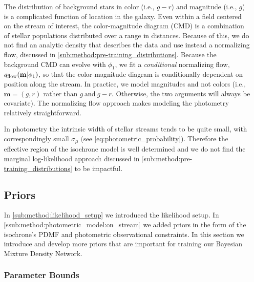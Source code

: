 \documentclass[twocolumn]{aastex631}
\begin{document}
            The distribution of background stars in color (i.e., $g-r$) and
            magnitude (i.e., $g$) is a complicated function of location in the
            galaxy. Even within a field centered on the stream of interest, the
            color-magnitude diagram (CMD) is a combination of stellar
            populations distributed over a range in distances. Because of this,
            we do not find an analytic density that describes the data and use
            instead a normalizing flow, discussed in
            \autoref{sub:method:pre-training_distributions}.  Because the
            background CMD can evolve with $\phi_1$, we fit a \emph{conditional}
            normalizing flow, $q_{\rm flow}(\mathbf{m}|\phi_1)$, so that the
            color-magnitude diagram is conditionally dependent on position along
            the stream. In practice, we model magnitudes and not colors (i.e.,
            $\mathbf{m} = (g,r)$ rather than $g \ \mathrm{and} \ g-r$.
            Otherwise, the two arguments will always be covariate). The
            normalizing flow approach makes modeling the photometry relatively
            straightforward.

            In photometry the intrinsic width of stellar streams tends to be
            quite small, with correspondingly small $\sigma_\mu$ (see
            \autoref{eq:photometric_probability}). Therefore the effective
            region of the isochrone model is well determined and we do not find
            the marginal log-likelihood approach discussed in
            \autoref{sub:method:pre-training_distributions} to be impactful.



    \subsection{Priors} \label{sub:methods:priors}

        In \autoref{sub:method:likelihood_setup} we introduced the likelihood
        setup. In \autoref{ssub:method:photometric_model:on_stream} we added
        priors in the form of the isochrone's PDMF and photometric observational
        constraints. In this section we introduce and develop more priors that
        are important for training our Bayesian Mixture Density Network.

        \subsubsection{Parameter Bounds} \label{ssub:methods:priors:parameter_bounds}
\end{document}
